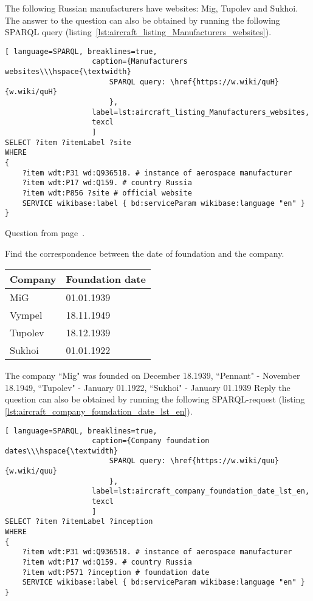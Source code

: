 The following Russian manufacturers have websites: Mig, Tupolev and Sukhoi. The answer to the question can also be obtained by running the following SPARQL query (listing~\ref{lst:aircraft_listing_Manufacturers_websites}). 
    
\begin{lstlisting}[ language=SPARQL, breaklines=true, 
                    caption={Manufacturers websites\\\hspace{\textwidth}
                        SPARQL query: \href{https://w.wiki/quH}{w.wiki/quH}
                        },
                    label=lst:aircraft_listing_Manufacturers_websites,
                    texcl 
                    ]
SELECT ?item ?itemLabel ?site
WHERE
{
    ?item wdt:P31 wd:Q936518. # instance of aerospace manufacturer
  	?item wdt:P17 wd:Q159. # country Russia
  	?item wdt:P856 ?site # official website
    SERVICE wikibase:label { bd:serviceParam wikibase:language "en" }
}
\end{lstlisting}

Question from page~\pageref{question:aircraft_manufacturers_en}.


\begin{exercise}%
    \label{answer:aircraft_answer_2}
Find the correspondence between the date of foundation and the company.
\\
\begin{tabular}{ l | l }
Company & Foundation date \\ \hline
MiG & 01.01.1939 \\
Vympel & 18.11.1949 \\
Tupolev & 18.12.1939 \\
Sukhoi & 01.01.1922 \\
\end{tabular}
\end{exercise}

The company ``Mig" was founded on December 18.1939, ``Pennant" - November 18.1949, ``Tupolev" - January 01.1922, ``Sukhoi" - January 01.1939 Reply the question can also be obtained by running the following SPARQL-request (listing \ref{lst:aircraft_company_foundation_date_lst_en}). 
       
\begin{lstlisting}[ language=SPARQL, breaklines=true, 
                    caption={Company foundation dates\\\hspace{\textwidth}
                        SPARQL query: \href{https://w.wiki/quu}{w.wiki/quu}
                        },
                    label=lst:aircraft_company_foundation_date_lst_en,
                    texcl 
                    ]
SELECT ?item ?itemLabel ?inception
WHERE
{
    ?item wdt:P31 wd:Q936518. # instance of aerospace manufacturer
  	?item wdt:P17 wd:Q159. # country Russia
  	?item wdt:P571 ?inception # foundation date
    SERVICE wikibase:label { bd:serviceParam wikibase:language "en" }
}
\end{lstlisting}

